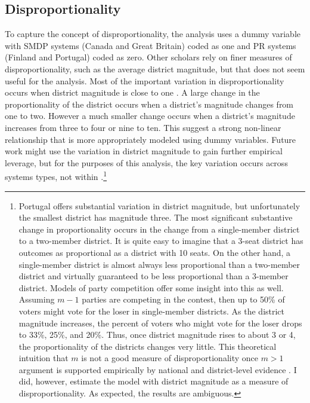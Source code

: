 \documentclass[12pt]{article}
\begin{document}
\subsection*{Disproportionality}

To capture the concept of disproportionality, the analysis uses a dummy variable with SMDP systems (Canada and Great Britain) coded as one and PR systems (Finland and Portugal) coded as zero. Other scholars rely on finer measures of disproportionality, such as the average district magnitude, but that does not seem useful for the analysis. Most of the important variation in disproportionality occurs when district magnitude is close to one \citep{GrofmanSelb2011}. A large change in the proportionality of the district occurs when a district's magnitude changes from one to two. However a much smaller change occurs when a district's magnitude increases from three to four or nine to ten. This suggest a strong non-linear relationship that is more appropriately modeled using dummy variables. Future work might use the variation in district magnitude to gain further empirical leverage, but for the purposes of this analysis, the key variation occurs across systems types, not within \citep{ TaageperaShugart1989, Taagepera2007,GrofmanSelb2011}.\footnote{Portugal offers substantial variation in district magnitude, but unfortunately the smallest district has magnitude three. The most significant substantive change in proportionality occurs in the change from a single-member district to a two-member district. It is quite easy to imagine that a 3-seat district has outcomes as proportional as a district with 10 seats. On the other hand, a single-member district is almost always less proportional than a two-member district and virtually guaranteed to be less proportional than a 3-member district. Models of party competition offer some insight into this as well. Assuming $m-1$ parties are competing in the contest, then up to 50\% of voters might vote for the loser in single-member districts. As the district magnitude increases, the percent of voters who might vote for the loser drops to 33\%, 25\%, and 20\%. Thus, once district magnitude rises to about 3 or 4, the proportionality of the districts changes very little. This theoretical intuition that $m$ is not a good measure of disproportionality once $m > 1$ argument is supported empirically by national \citep{Taagepera2007, TaageperaShugart1989} and district-level evidence \citep{GrofmanSelb2011}. I did, however, estimate the model with district magnitude as a measure of disproportionality. As expected, the results are ambiguous.}
\end{document}
